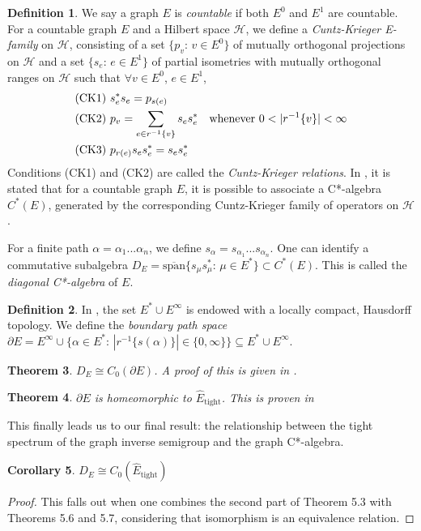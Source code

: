 \documentclass[12pt]{article}
\newtheorem{theorem}{Theorem}[section]
\newtheorem{corollary}[theorem]{Corollary}
\theoremstyle{definition}
\newtheorem{definition}[theorem]{Definition}
\begin{document}
\begin{definition} \parencite[Chapter 5]{raeburn}
    We say a graph $E$ is \emph{countable} if both $E^0$ and $E^1$ are countable.
    For a countable graph $E$ and a Hilbert space $\mathcal{H}$, we define
    a \emph{Cuntz-Krieger E-family} on $\mathcal{H}$, consisting of a set 
    $\{p_v\text{: } v \in E^0\}$ of mutually orthogonal projections on $\mathcal{H}$
    and a set $\{s_e\text{: } e \in E^1\}$ of partial isometries with mutually orthogonal ranges
    on $\mathcal{H}$ such that $\forall v \in E^0$, $e \in E^1$,
    \begin{align*}
        &\text{(CK1) } s_e^* s_e = p_{s(e)} \\
        &\text{(CK2) } p_v = \sum_{e \in r^{-1}\{v\}} s_e s_e^* \text{\quad whenever } 0 < |r^{-1}\{v\}| < \infty \\
        &\text{(CK3) } p_{r(e)} s_e s_e^* = s_e s_e^*
    \end{align*}
    Conditions (CK1) and (CK2) are called the \emph{Cuntz-Krieger relations}.
    In \parencite[Definition 1]{infgraphs}, it is stated that for a countable graph $E$, 
    it is possible to associate a C*-algebra $C^*(E)$, generated by the corresponding Cuntz-Krieger
    family of operators on $\mathcal{H}$.
\end{definition} 
For a finite path $\alpha = \alpha_1 ... \alpha_n$, we define $s_\alpha = s_{\alpha_1} ... s_{\alpha_n}$.
One can identify a commutative subalgebra $D_E = \overline{\text{span}}\{s_\mu s_\mu^*\text{: } \mu \in E^*\} \subset C^*(E)$.
This is called the \emph{diagonal C*-algebra} of $E$.

\begin{definition}
    In \cite[Theorem 2.1]{webster}, the set $E^* \cup E^\infty$ is endowed with
    a locally compact, Hausdorff topology. We define the \emph{boundary path space}
    $\partial E = E^\infty \cup \{\alpha \in E^*\text{: } |r^{-1}\{s(\alpha)\}| \in \{0, \infty\}\} \subseteq E^* \cup E^\infty$.
\end{definition}

\begin{theorem} $D_E \cong C_0(\partial E)$. \emph{A proof of this is given in \cite[Theorem 3.7]{webster}.} \end{theorem}

\begin{theorem} $\partial E$ is homeomorphic to $\hat{E}_\text{tight}$. \emph{This is proven in \cite[Example 6.8]{boava}} \end{theorem}

This finally leads us to our final result: the relationship between the tight 
spectrum of the graph inverse semigroup and the graph C*-algebra.
\begin{corollary} $D_E \cong C_0(\hat{E}_\text{tight})$ \end{corollary}
\begin{proof}
    This falls out when one combines the second part of Theorem 5.3 with Theorems 5.6 and 5.7,
    considering that isomorphism is an equivalence relation.
\end{proof}

\printbibliography
\end{document}

